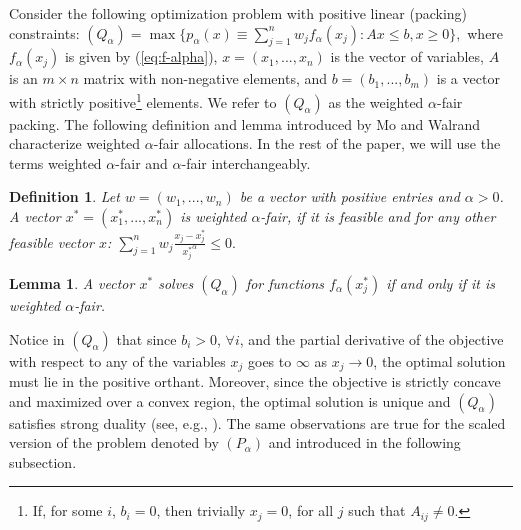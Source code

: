 \documentclass[11pt]{article}
\makeatletter
\newtheorem{lemma}[theorem]{Lemma}
\newtheorem{definition}[theorem]{Definition}
\renewcommand{\paragraph}{\@startsection{paragraph}{4}{\z@}{1ex \@plus 1ex \@minus .2ex}{-.5em}{\normalfont\normalsize\bfseries}}
\makeatother
\begin{document}
\paragraph{Weighted $\alpha$-Fair Packing.} Consider the following optimization problem with positive linear (packing) constraints:
$
{(Q_\alpha)}=\max \{p_\alpha(x)\equiv\sum_{j=1}^n w_jf_{\alpha}(x_j): Ax \leq b, x\geq 0\},
$
where $f_{\alpha}(x_j)$ is given by (\ref{eq:f-alpha}), $x=(x_1,...,x_n)$ is the vector of variables, $A$ is an $m\times n$ matrix with non-negative elements, and $b=(b_1,...,b_m)$ is a vector with strictly positive\footnote{If, for some $i$, $b_i=0$, then trivially $x_j = 0$, for all $j$ such that $A_{ij}\neq 0$.} elements. We refer to $(Q_\alpha)$ as the weighted $\alpha$-fair packing. 
The following definition and lemma introduced by Mo and Walrand \cite{MoWalrand2000} characterize weighted $\alpha$-fair allocations. In the rest of the paper, we will use the terms weighted $\alpha$-fair and $\alpha$-fair interchangeably.

\begin{definition}
\emph{\cite{MoWalrand2000}} Let $w=(w_1, ..., w_n)$ be a vector with positive entries and $\alpha>0$. A vector  $x^*=(x_1^*,...,x_n^*)$ is weighted $\alpha$-fair, if it is feasible and for any other feasible vector $x$: 
$
\sum_{j=1}^n w_j\frac{x_j-x_j^*}{{x_j^*}^\alpha}\leq 0.
$
\end{definition}
\begin{lemma}
\emph{\cite{MoWalrand2000}} A vector $x^*$ solves $(Q_\alpha)$ for functions $f_{\alpha}(x_j^*)$ if and only if it is weighted $\alpha$-fair.
\end{lemma}

Notice in $(Q_\alpha)$ that since $b_i > 0$, $\forall i$, and the partial derivative of the objective with respect to any of the variables $x_j$ goes to $\infty$ as $x_j\rightarrow 0$, the optimal solution must lie in the positive orthant. Moreover, since the objective is strictly concave and maximized over a convex region, the optimal solution is unique and $(Q_\alpha)$ satisfies strong duality (see, e.g., \cite{boyd2009convex}). The same observations are true for the scaled version of the problem denoted by $(P_\alpha)$ and introduced in the following subsection.
\end{document}
